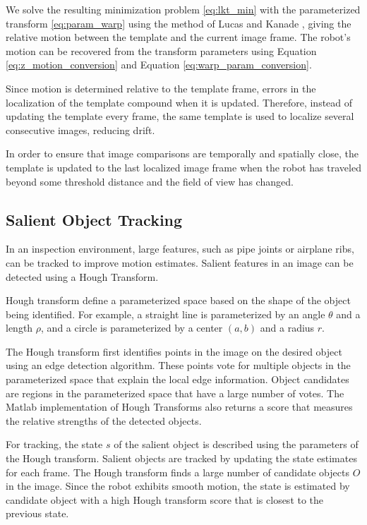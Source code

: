 \documentclass[letterpaper, 10 pt, conference]{ieeeconf}
\begin{document}
We solve the resulting minimization problem \eqref{eq:lkt_min} with the parameterized transform \eqref{eq:param_warp} using the method of Lucas and Kanade \cite{Lucas81, lucaskanade}, giving the relative motion between the template and the current image frame. The robot's motion can be recovered from the transform parameters using Equation \eqref{eq:z_motion_conversion} and Equation \eqref{eq:warp_param_conversion}.

Since motion is determined relative to the template frame, errors in the localization of the template compound when it is updated. Therefore, instead of updating the template every frame, the same template is used to localize several consecutive images, reducing drift.

In order to ensure that image comparisons are temporally and spatially close, the template is updated to the last localized image frame when the robot has traveled beyond some threshold distance and the field of view has changed.

\subsection{Salient Object Tracking}

In an inspection environment, large features, such as pipe joints or airplane ribs, can be tracked to improve motion estimates. Salient features in an image can be detected using a Hough Transform.

Hough transform define a parameterized space based on the shape of the object being identified. For example, a straight line is parameterized by an angle $\theta$ and a length $\rho$, and a circle is parameterized by a center $(a, b)$ and a radius $r$.

The Hough transform first identifies points in the image on the desired object using an edge detection algorithm. These points vote for multiple objects in the parameterized space that explain the local edge information. Object candidates are regions in the parameterized space that have a large number of votes. The Matlab implementation of Hough Transforms also returns a score that measures the relative strengths of the detected objects.

For tracking, the state $s$ of the salient object is described using the parameters of the Hough transform. Salient objects are tracked by updating the state estimates for each frame. The Hough transform finds a large number of candidate objects $O$ in the image. Since the robot exhibits smooth motion, the state is estimated by candidate object with a high Hough transform score that is closest to the previous state. 
\end{document}
